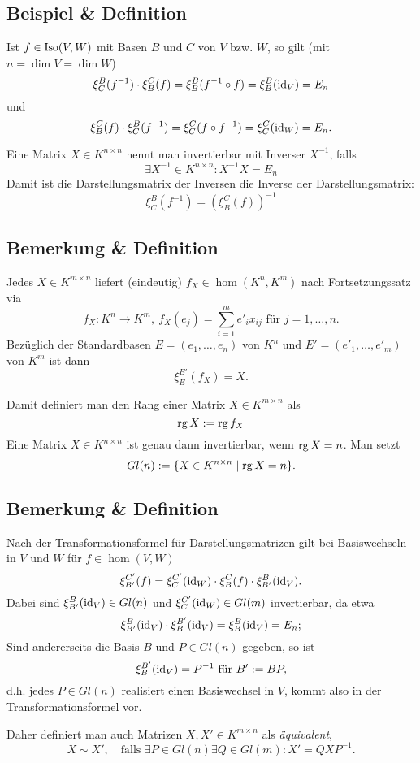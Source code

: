\subsection{Beispiel \& Definition}
	Ist $ f\in \operatorname{Iso}(V,W) $ mit Basen $ B $ und $ C $ von $ V $ bzw. $ W $, so gilt (mit $ n=\dim V = \dim W $)
		\[ \xi_C^B(f^{-1})\cdot \xi_B^C(f) = \xi_B^B(f^{-1}\circ f) = \xi_B^B(\operatorname{id}_V) = E_n \]
	und
		\[ \xi_B^C(f)\cdot \xi_C^B(f^{-1})=\xi_C^C(f\circ f^{-1}) = \xi_C^C(\operatorname{id}_W)=E_n. \]
		
	\begin{Definition}
	Eine Matrix $ X\in K^{n\times n} $ nennt man invertierbar mit Inverser $ X^{-1} $, falls
		\[ \exists X^{-1}\in K^{n\times n}:X^{-1}X = E_n \]
	Damit ist die Darstellungsmatrix der Inversen die Inverse der Darstellungsmatrix:
		\[ \xi_C^B(f^{-1}) = (\xi_B^C(f))^{-1} \]
	\end{Definition}
\subsection{Bemerkung \& Definition}
	Jedes $ X\in K^{m\times n} $ liefert (eindeutig) $ f_X\in \hom(K^n,K^m) $ nach Fortsetzungssatz via
		\[ f_X:K^n\to K^m,\ f_X(e_j) = \sum_{i=1}^{m} e'_ix_{ij} \text{ für } j=1,\dots,n. \]
	Bezüglich der Standardbasen $ E = (e_1,\dots,e_n) $ von $ K^n $ und $ E'=(e'_1,\dots,e'_m) $ von $ K^m $ ist dann
		\[ \xi_E^{E'}(f_X) = X. \]

	\begin{Definition}
	Damit definiert man den Rang einer Matrix $ X\in K^{m\times n} $ als 
		\[ \operatorname{rg} X:=\operatorname{rg} f_X \]
	Eine Matrix $ X\in K^{n\times n} $ ist genau dann invertierbar, wenn $ \operatorname{rg} X = n $. Man setzt
		\[ Gl(n):= \{X\in K^{n\times n}\mid \operatorname{rg} X =n\}. \]
	\end{Definition}
\subsection{Bemerkung \& Definition}
	Nach der Transformationsformel für Darstellungsmatrizen gilt bei Basiswechseln in $ V $ und $ W $ für $ f\in \hom(V,W) $
		\[ \xi_{B'}^{C'}(f) = \xi_C^{C'}(\operatorname{id}_W)\cdot \xi_B^C(f)\cdot \xi_{B'}^B(\operatorname{id}_V). \]
	Dabei sind $ \xi_{B'}^B(\operatorname{id}_V)\in Gl(n) $ und $ \xi_C^{C'}(\operatorname{id}_W)\in Gl(m) $ invertierbar, da etwa
		\[ \xi^B_{B'}(\operatorname{id}_V)\cdot\xi_B^{B'}(\operatorname{id}_V) = \xi_B^B(\operatorname{id}_V)=E_n; \]
	Sind andererseits die Basis $ B $ und $ P\in Gl(n) $ gegeben, so ist
		\[ \xi_B^{B'}(\operatorname{id}_V)=P^{-1} \text{ für } B':= BP, \]
	d.h. jedes $ P\in Gl(n) $ realisiert einen Basiswechsel in $ V $, kommt also in der Transformationsformel vor.
	
	\begin{Definition}
	Daher definiert man auch Matrizen $ X,X'\in K^{m\times n} $ als \emph{äquivalent},
		\[ X\sim X',\quad \text{falls }\exists P\in Gl(n)\exists Q\in Gl(m):X' = QXP^{-1}.  \]
	\end{Definition}

